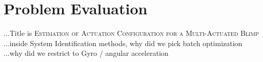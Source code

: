 \chapter{Problem Evaluation}
\label{chap:problem_evaluation}

...Title is \textsc{Estimation of Actuation Configuration for a Multi-Actuated Blimp}
...inside System Identification methods, why did we pick batch optimization
...why did we restrict to Gyro / angular acceleration